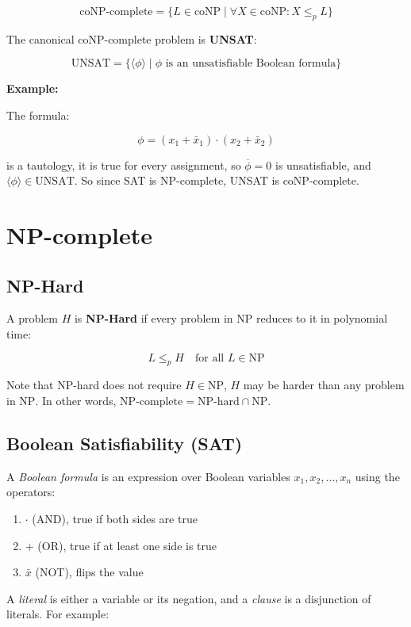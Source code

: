 \documentclass[12pt,a4paper,openany]{article}
\begin{document}
\[
\mathrm{coNP\text{-}complete} = \{ L \in \mathrm{coNP} \mid \forall X \in \mathrm{coNP}: X \leq_p L \}
\]

The canonical coNP-complete problem is \textbf{UNSAT}:

\[
\mathrm{UNSAT} = \{ \langle \phi \rangle \mid \phi \text{ is an unsatisfiable Boolean formula} \}
\]

\textbf{Example:} 

The formula:

\[
\phi = (x_1 + \bar{x}_1) \cdot (x_2 + \bar{x}_2)
\]

is a tautology, it is true for every assignment, so $\overline{\phi} = 0$ is
unsatisfiable, and $\langle \phi \rangle \in \mathrm{UNSAT}$.
So since SAT is NP-complete, UNSAT is coNP-complete.

\section{NP-complete}

\subsection{NP-Hard}

A problem $H$ is \textbf{NP-Hard} if every problem in $\mathrm{NP}$ reduces to it in polynomial time:

\[
L \leq_p H \quad \text{for all } L \in \mathrm{NP}
\]

Note that NP-hard does not require $H \in \mathrm{NP}$, $H$ may be harder than any problem in $\mathrm{NP}$.
In other words, $\mathrm{NP}\text{-complete} = \mathrm{NP}\text{-hard} \cap \mathrm{NP}$.

\subsection{Boolean Satisfiability (SAT)}

A \emph{Boolean formula} is an expression over Boolean variables $x_1, x_2, \ldots, x_n$ using the operators:

\begin{enumerate}
    \item $\cdot$ (AND), true if both sides are true
    \item $+$ (OR), true if at least one side is true
    \item $\bar{x}$ (NOT), flips the value
\end{enumerate}

A \emph{literal} is either a variable or its negation, and a \emph{clause} is a disjunction of literals. For example:
\end{document}
